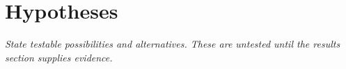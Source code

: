 \section{Hypotheses}
\label{sec:hypotheses}
\emph{State testable possibilities and alternatives. These are untested until
the results section supplies evidence.}
